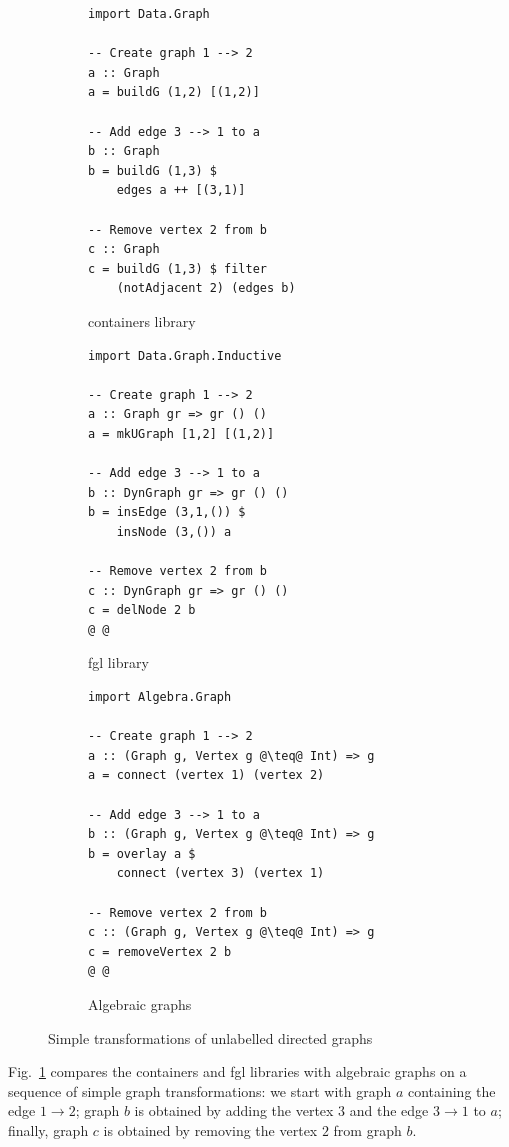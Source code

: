 \documentclass[acmlarge,anonymous]{acmart}\settopmatter{printfolios=true}
\begin{document}
\begin{figure}
\begin{subfigure}[b]{0.28\linewidth}
\begin{verbatim}
import Data.Graph

-- Create graph 1 --> 2
a :: Graph
a = buildG (1,2) [(1,2)]

-- Add edge 3 --> 1 to a
b :: Graph
b = buildG (1,3) $
    edges a ++ [(3,1)]

-- Remove vertex 2 from b
c :: Graph
c = buildG (1,3) $ filter
    (notAdjacent 2) (edges b)
\end{verbatim}
\caption{\textsf{containers} library}
\end{subfigure}
\hfill
\hfill
\vrule
\hfill
\hfill
\begin{subfigure}[b]{0.3\linewidth}
\begin{verbatim}
import Data.Graph.Inductive

-- Create graph 1 --> 2
a :: Graph gr => gr () ()
a = mkUGraph [1,2] [(1,2)]

-- Add edge 3 --> 1 to a
b :: DynGraph gr => gr () ()
b = insEdge (3,1,()) $
    insNode (3,()) a

-- Remove vertex 2 from b
c :: DynGraph gr => gr () ()
c = delNode 2 b
@ @
\end{verbatim}
\caption{\textsf{fgl} library}
\end{subfigure}
\hfill
\vrule
\hfill
\hfill
\begin{subfigure}[b]{0.35\linewidth}
\begin{verbatim}
import Algebra.Graph

-- Create graph 1 --> 2
a :: (Graph g, Vertex g @\teq@ Int) => g
a = connect (vertex 1) (vertex 2)

-- Add edge 3 --> 1 to a
b :: (Graph g, Vertex g @\teq@ Int) => g
b = overlay a $
    connect (vertex 3) (vertex 1)

-- Remove vertex 2 from b
c :: (Graph g, Vertex g @\teq@ Int) => g
c = removeVertex 2 b
@ @
\end{verbatim}
\caption{Algebraic graphs}
\end{subfigure}
\caption{Simple transformations of unlabelled directed graphs\label{fig-example}}
\vspace{-4mm}
\end{figure}

Fig.~\ref{fig-example} compares the \textsf{containers} and
\textsf{fgl} libraries with algebraic graphs on a sequence of
simple graph transformations: we start with graph $a$ containing the
edge $1 \rightarrow 2$; graph $b$ is obtained by adding the vertex $3$
and the edge $3 \rightarrow 1$ to $a$; finally, graph $c$ is obtained by removing
the vertex $2$ from graph $b$.
\end{document}
